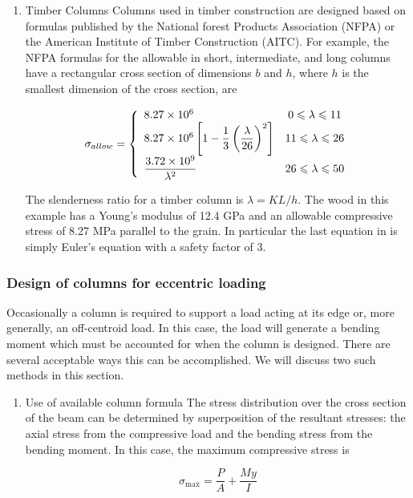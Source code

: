 \documentclass[a4paper,openany,nobib]{tufte-book}
\begin{document}
{{\begin{enumerate}
\item Timber Columns
\label{timber-columns}
Columns used in timber construction are designed based on formulas
published by the National forest Products Association (NFPA) or the
American Institute of Timber Construction (AITC). For example, the NFPA
formulas for the allowable in short, intermediate, and long columns have
a rectangular cross section of dimensions \(b\) and \(h\), where \(h\) is the
smallest dimension of the cross section, are

$$\sigma_{allow} = \left\{
    \begin{array}{l c}
      8.27 \times 10^6 & 0 \leqslant \lambda \leqslant 11 \\ 
      8.27 \times 10^6\left[ 1 - \dfrac{1}{3} \left( \dfrac{\lambda}{26} \right)^2 \right] & 11 \leqslant \lambda \leqslant 26 \\ 
      \dfrac{3.72 \times 10^9}{\lambda^2} & 26 \leqslant \lambda \leqslant 50 
    \end{array} \right.$$

The slenderness ratio for a timber column is \(\lambda = KL/h\). The wood
in this example has a Young's modulus of 12.4 GPa and an allowable
compressive stress of 8.27 MPa parallel to the grain. In particular the
last equation in is simply Euler's equation with a safety factor of 3.
\end{enumerate}


\subsubsection{Design of columns for eccentric loading}
\label{design-of-columns-for-eccentric-loading}
Occasionally a column is required to support a load acting at its edge
or, more generally, an off-centroid load. In this case, the load will
generate a bending moment which must be accounted for when the column is
designed. There are several acceptable ways this can be accomplished. We
will discuss two such methods in this section.


\begin{enumerate}
\item Use of available column formula
\label{use-of-available-column-formula}
The stress distribution over the cross section of the beam can be
determined by superposition of the resultant stresses: the axial stress
from the compressive load and the bending stress from the bending
moment. In this case, the maximum compressive stress is

$${\sigma_{\max}} = \frac{P}{A} + \frac{{My}}{I}$$


\end{enumerate}}}
\end{document}
